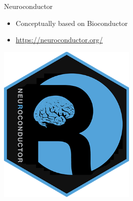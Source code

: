 \documentclass[
  ignorenonframetext,
]{beamer}
\providecommand{\tightlist}{%
  \setlength{\itemsep}{0pt}\setlength{\parskip}{0pt}}
\begin{document}
\begin{frame}{Neuroconductor}
\protect\hypertarget{neuroconductor}{}

\begin{itemize}
\tightlist
\item
  Conceptually based on Bioconductor
\item
  \url{https://neuroconductor.org/}
\end{itemize}

\includegraphics[width=0.5\textwidth,height=\textheight]{../external/images/neuro_logo1.png}

\end{frame}
\end{document}
